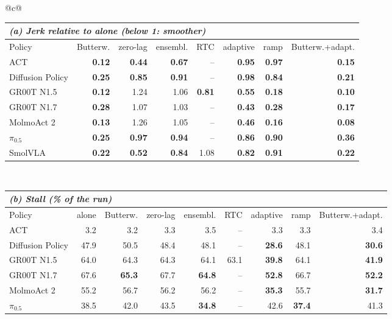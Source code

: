 \begin{tabular}{@{}c@{}}
\begin{tabular}{l rrrrrrr}
\toprule
\multicolumn{8}{l}{\textit{(a) Jerk relative to \drtc{} alone (below 1: smoother)}} \\
\midrule
Policy & Butterw. & zero-lag & ensembl. & RTC & adaptive & ramp & Butterw.+adapt. \\
\midrule
ACT & \textbf{0.12} & \textbf{0.44} & \textbf{0.67} & -- & \textbf{0.95} & \textbf{0.97} & \textbf{0.15} \\
Diffusion Policy & \textbf{0.25} & \textbf{0.85} & \textbf{0.91} & -- & \textbf{0.98} & \textbf{0.84} & \textbf{0.21} \\
GR00T N1.5 & \textbf{0.12} & 1.24 & 1.06 & \textbf{0.81} & \textbf{0.55} & \textbf{0.18} & \textbf{0.10} \\
GR00T N1.7 & \textbf{0.28} & 1.07 & 1.03 & -- & \textbf{0.43} & \textbf{0.28} & \textbf{0.17} \\
MolmoAct 2 & \textbf{0.13} & 1.26 & 1.05 & -- & \textbf{0.46} & \textbf{0.16} & \textbf{0.08} \\
$\pi_{0.5}$ & \textbf{0.25} & \textbf{0.97} & \textbf{0.94} & -- & \textbf{0.86} & \textbf{0.90} & \textbf{0.36} \\
SmolVLA & \textbf{0.22} & \textbf{0.52} & \textbf{0.84} & 1.08 & \textbf{0.82} & \textbf{0.91} & \textbf{0.22} \\
\bottomrule
\end{tabular}
\\[8pt]
\begin{tabular}{l rrrrrrrr}
\toprule
\multicolumn{9}{l}{\textit{(b) Stall (\% of the run)}} \\
\midrule
Policy & \drtc{} alone & Butterw. & zero-lag & ensembl. & RTC & adaptive & ramp & Butterw.+adapt. \\
\midrule
ACT & 3.2 & 3.2 & 3.3 & 3.5 & -- & 3.3 & 3.3 & 3.4 \\
Diffusion Policy & 47.9 & 50.5 & 48.4 & 48.1 & -- & \textbf{28.6} & 48.1 & \textbf{30.6} \\
GR00T N1.5 & 64.0 & 64.3 & 64.3 & 64.1 & 63.1 & \textbf{39.8} & 64.1 & \textbf{41.9} \\
GR00T N1.7 & 67.6 & \textbf{65.3} & 67.7 & \textbf{64.8} & -- & \textbf{52.8} & 66.7 & \textbf{52.2} \\
MolmoAct 2 & 55.2 & 56.7 & 56.2 & 56.2 & -- & \textbf{35.3} & 55.7 & \textbf{31.7} \\
$\pi_{0.5}$ & 38.5 & 42.0 & 43.5 & \textbf{34.8} & -- & 42.6 & \textbf{37.4} & 41.3 \\

\end{tabular}
\end{tabular}

